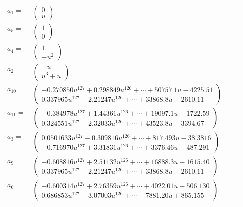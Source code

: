 \documentclass[1p]{elsarticle_modified}
\theoremstyle{definition}
\begin{document}
\begin{tabular}{m{7pt} m{180pt} m{7pt} m{180pt} }
\flushright $a_{1}=$&$\begin{pmatrix}0\\u\end{pmatrix}$ \\
\flushright $a_{5}=$&$\begin{pmatrix}1\\0\end{pmatrix}$ \\
\flushright $a_{4}=$&$\begin{pmatrix}1\\- u^2\end{pmatrix}$ \\
\flushright $a_{2}=$&$\begin{pmatrix}- u\\u^3+u\end{pmatrix}$ \\
\flushright $a_{10}=$&$\begin{pmatrix}-0.270850 u^{127}+0.298849 u^{126}+\cdots+50757.1 u-4225.51\\0.337965 u^{127}-2.21247 u^{126}+\cdots+33868.8 u-2610.11\end{pmatrix}$ \\
\flushright $a_{11}=$&$\begin{pmatrix}-0.384978 u^{127}+1.44361 u^{126}+\cdots+19097.1 u-1722.59\\0.324551 u^{127}-2.32033 u^{126}+\cdots+43523.8 u-3394.67\end{pmatrix}$ \\
\flushright $a_{3}=$&$\begin{pmatrix}0.0501633 u^{127}-0.309816 u^{126}+\cdots+817.493 u-38.3816\\-0.716970 u^{127}+3.31831 u^{126}+\cdots+3376.46 u-487.291\end{pmatrix}$ \\
\flushright $a_{9}=$&$\begin{pmatrix}-0.608816 u^{127}+2.51132 u^{126}+\cdots+16888.3 u-1615.40\\0.337965 u^{127}-2.21247 u^{126}+\cdots+33868.8 u-2610.11\end{pmatrix}$ \\
\flushright $a_{6}=$&$\begin{pmatrix}-0.600314 u^{127}+2.76359 u^{126}+\cdots+4022.01 u-506.130\\0.686853 u^{127}-3.07003 u^{126}+\cdots-7881.20 u+865.155\end{pmatrix}$ \\

\end{tabular}
\end{document}
